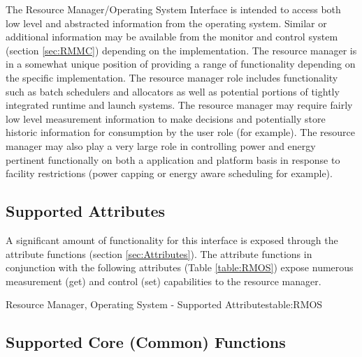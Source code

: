 The Resource Manager/Operating System Interface is intended to access both low level and abstracted information from the operating system. 
Similar or additional information may be available from the monitor and control system (section \ref{sec:RMMC}) depending on the implementation.
The resource manager is in a somewhat unique position of providing a range of functionality depending on the specific implementation.
The resource manager role includes functionality such as batch schedulers and allocators as well as potential portions of tightly integrated runtime and launch systems.
The resource manager may require fairly low level measurement information to make decisions and potentially store historic information for consumption by the user role (for example). 
The resource manager may also play a very large role in controlling power and energy pertinent functionally on both a application and platform basis in response to facility restrictions (power capping or energy aware scheduling for example).

\subsection{Supported Attributes}\label{sec:RMOSAttributes}
A significant amount of functionality for this interface is exposed through the attribute functions (section \ref{sec:Attributes}).
The attribute functions in conjunction with the following attributes (Table \ref{table:RMOS}) expose numerous measurement  (get) and control (set) capabilities to the resource manager.

\begin{attributetable}{Resource Manager, Operating System - Supported Attributes}{table:RMOS}
	\aPstateDesc
	\aCstateDesc
	\aCstateLimitDesc
	\aSstateDesc
	\aPowerDesc
	\aMinPowerDesc
	\aMaxPowerDesc
	\aFreqDesc
	\aFreqLimitMinDesc 
	\aFreqLimitMaxDesc
	\aEnergyDesc
	\aTempDesc
\end{attributetable}

\subsection{Supported Core (Common) Functions}\label{sec:RMOSSupportedCommon}

